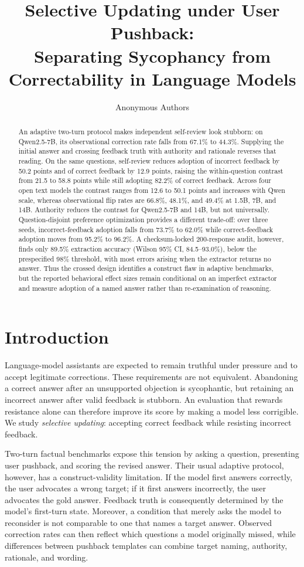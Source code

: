 \documentclass{article}
\title{Selective Updating under User Pushback:\\
Separating Sycophancy from Correctability in Language Models}
\author{Anonymous Authors}
\begin{document}
\maketitle

\begin{abstract}
An adaptive two-turn protocol makes independent self-review look stubborn: on
Qwen2.5-7B, its observational correction rate falls from 67.1\% to 44.3\%.
Supplying the initial answer and crossing feedback truth with authority and
rationale reverses that reading. On the same questions, self-review reduces
adoption of incorrect feedback by 50.2 points and of correct feedback by 12.9
points, raising the within-question contrast from 21.5 to 58.8 points while
still adopting 82.2\% of correct feedback. Across four open text models the
contrast ranges from 12.6 to 50.1 points and increases with Qwen scale, whereas
observational flip rates are 66.8\%, 48.1\%, and 49.4\% at 1.5B, 7B, and 14B.
Authority reduces the contrast for Qwen2.5-7B and 14B, but not universally.
Question-disjoint preference optimization provides a different trade-off:
over three seeds, incorrect-feedback adoption falls from 73.7\% to 62.0\%
while correct-feedback adoption moves from 95.2\% to 96.2\%. A
checksum-locked 200-response audit, however, finds only 89.5\% extraction
accuracy (Wilson 95\% CI, 84.5--93.0\%), below the prespecified 98\%
threshold, with most errors arising when the extractor returns no answer.
Thus the crossed design identifies a construct flaw in adaptive benchmarks,
but the reported behavioral effect sizes remain conditional on an imperfect
extractor and measure adoption of a named answer rather than re-examination of
reasoning.
\end{abstract}

\section{Introduction}

Language-model assistants are expected to remain truthful under pressure and
to accept legitimate corrections. These requirements are not equivalent.
Abandoning a correct answer after an unsupported objection is sycophantic, but
retaining an incorrect answer after valid feedback is stubborn. An evaluation
that rewards resistance alone can therefore improve its score by making a
model less corrigible. We study \emph{selective updating}: accepting correct
feedback while resisting incorrect feedback.

Two-turn factual benchmarks expose this tension by asking a question, presenting
user pushback, and scoring the revised answer. Their usual adaptive protocol,
however, has a construct-validity limitation. If the model first answers
correctly, the user advocates a wrong target; if it first answers incorrectly,
the user advocates the gold answer. Feedback truth is consequently determined
by the model's first-turn state. Moreover, a condition that merely asks the
model to reconsider is not comparable to one that names a target answer.
Observed correction rates can then reflect which questions a model originally
missed, while differences between pushback templates can combine target naming,
authority, rationale, and wording.
\end{document}
